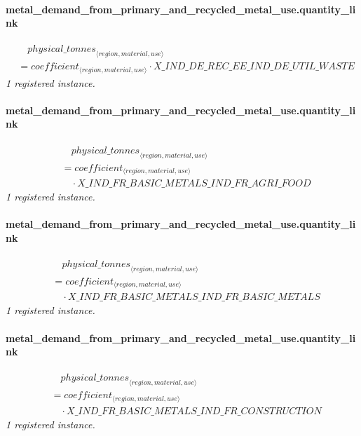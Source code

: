 \documentclass[11pt]{article}
\begin{document}
\paragraph{metal\_demand\_from\_primary\_and\_recycled\_metal\_use.quantity\_link}
\begin{align*}
&\quad {physical\_tonnes}_{\langle region, material, use\rangle}\\
&= coefficient_{\langle region, material, use\rangle} \cdot X\_IND\_DE\_REC\_EE\_IND\_DE\_UTIL\_WASTE
\end{align*}
\noindent\emph{1 registered instance.}\par
\paragraph{metal\_demand\_from\_primary\_and\_recycled\_metal\_use.quantity\_link}
\begin{align*}
&\quad {physical\_tonnes}_{\langle region, material, use\rangle}\\
&= coefficient_{\langle region, material, use\rangle}\\
&\quad {}\cdot X\_IND\_FR\_BASIC\_METALS\_IND\_FR\_AGRI\_FOOD
\end{align*}
\noindent\emph{1 registered instance.}\par
\paragraph{metal\_demand\_from\_primary\_and\_recycled\_metal\_use.quantity\_link}
\begin{align*}
&\quad {physical\_tonnes}_{\langle region, material, use\rangle}\\
&= coefficient_{\langle region, material, use\rangle}\\
&\quad {}\cdot X\_IND\_FR\_BASIC\_METALS\_IND\_FR\_BASIC\_METALS
\end{align*}
\noindent\emph{1 registered instance.}\par
\paragraph{metal\_demand\_from\_primary\_and\_recycled\_metal\_use.quantity\_link}
\begin{align*}
&\quad {physical\_tonnes}_{\langle region, material, use\rangle}\\
&= coefficient_{\langle region, material, use\rangle}\\
&\quad {}\cdot X\_IND\_FR\_BASIC\_METALS\_IND\_FR\_CONSTRUCTION
\end{align*}
\noindent\emph{1 registered instance.}\par
\end{document}

